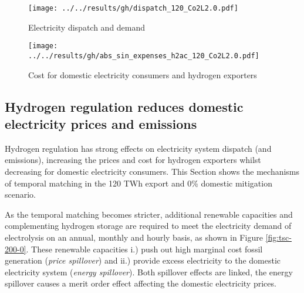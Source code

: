 \begin{figure*}[h!]
    \centering
    \begin{subfigure}[b]{0.49\linewidth}
        \centering
        \texttt{[image: ../../results/gh/dispatch\_120\_Co2L2.0.pdf]}
        \caption{Electricity dispatch and demand}
        \label{fig:dispatch_rule}
    \end{subfigure}
    \hfill
    \begin{subfigure}[b]{0.49\linewidth}
        \centering
        \texttt{[image: ../../results/gh/abs\_sin\_expenses\_h2ac\_120\_Co2L2.0.pdf]}
        \caption{Cost for domestic electricity consumers and hydrogen exporters}
        \label{fig:expense_h2ac}
    \end{subfigure}
    \hfill
    \caption{Electricity dispatch and demand (\ref{fig:dispatch_rule}) and cost for consumers (\ref{fig:expense_h2ac}) for various (hydrogen) temporal matching regimes in the 120 TWh export and 0\% mitigation scenario. Stricter temporal matching decreases carbon-intensive electricity generation (coal \& gas) for hydrogen generation and even domestic electricity consumers (s. Fig. \ref{fig:dispatch_rule}). Cost for export hydrogen generation increase to fulfill the temporal matching constraint, whereas domestic electricity consumers profit from stricter hydrogen regulation.}
    \label{fig:expenses_rule}
\end{figure*}


\subsection{Hydrogen regulation reduces domestic electricity prices and emissions}
\label{subsec:benefits_rule}

Hydrogen regulation has strong effects on electricity system dispatch (and emissions), increasing the prices and cost for hydrogen exporters whilst decreasing for domestic electricity consumers. This Section shows the mechanisms of temporal matching in the 120 TWh export and 0\% domestic mitigation scenario.

As the temporal matching becomes stricter, additional renewable capacities and complementing hydrogen storage are required to meet the electricity demand of electrolysis on an annual, monthly and hourly basis, as shown in Figure \ref{fig:tsc-200-0}. These renewable capacities i.) push out high marginal cost fossil generation (\textit{price spillover}) and ii.) provide excess electricity to the domestic electricity system (\textit{energy spillover}). Both spillover effects are linked, the energy spillover causes a merit order effect affecting the domestic electricity prices.

